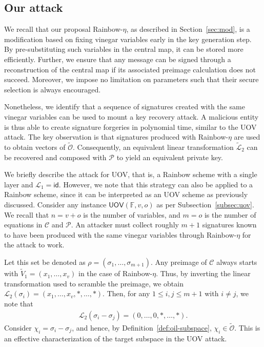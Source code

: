 \documentclass[12pt, a4paper, oneside]{memoir}
\theoremstyle{definition}
\begin{document}
\subsection{Our attack}\label{subsec:etaks}

We recall that our proposal Rainbow-$\eta$, as described in Section~\ref{sec:mod}, is a modification based on fixing vinegar variables early in the key generation step. By pre-substituting such variables in the central map, it can be stored more efficiently. Further, we ensure that any message can be signed through a reconstruction of the central map if its associated preimage calculation does not succeed. Moreover, we impose no limitation on parameters such that their secure selection is always encouraged.

Nonetheless, we identify that a sequence of signatures created with the same vinegar variables can be used to mount a key recovery attack. A malicious entity is thus able to create signature forgeries in polynomial time, similar to the UOV attack. The key observation is that signatures produced with Rainbow-$\eta$ are used to obtain vectors of $\widetilde{\mathcal{O}}$. Consequently, an equivalent linear transformation $\widetilde{\mathcal{L}}_{2}$ can be recovered and composed with $\mathcal{P}$ to yield an equivalent private key.

We briefly describe the attack for UOV, that is, a Rainbow scheme with a single layer and $\mathcal{L}_{1} = \textsf{id}$. However, we note that this strategy can also be applied to a Rainbow scheme, since it can be interpreted as an UOV scheme as previously discussed. Consider any instance $\textsf{UOV}(\mathbb{F}, v, o)$ as per Subsection~\ref{subsec:uov}. We recall that $n = v + o$ is the number of variables, and $m = o$ is the number of equations in $\mathcal{C}$ and $\mathcal{P}$. An attacker must collect roughly $m + 1$ signatures known to have been produced with the same vinegar variables through Rainbow-$\eta$ for the attack to work. 

Let this set be denoted as $\rho = (\sigma_{1}, \dots, \sigma_{m + 1})$. Any preimage of $\mathcal{C}$ always starts with $\widetilde{V}_{1} = (x_{1}, \dots, x_{v})$ in the case of Rainbow-$\eta$. Thus, by inverting the linear transformation used to scramble the preimage, we obtain $\mathcal{L}_{2}(\sigma_{i}) = (x_{1}, \dots, x_{v}, \ast, \dots, \ast)$. Then, for any $1 \leq i, j \leq m + 1$ with $i \neq j$, we note that
\begin{align}
  \mathcal{L}_{2}(\sigma_{i} - \sigma_{j}) = (0, \dots, 0, \ast, \dots, \ast).
\end{align}
Consider $\chi_{i} = \sigma_{i} - \sigma_{j}$, and hence, by Definition~\ref{def:oil-subspace}, $\chi_{i} \in \widetilde{\mathcal{O}}$. This is an effective characterization of the target subspace in the UOV attack. 
\end{document}
